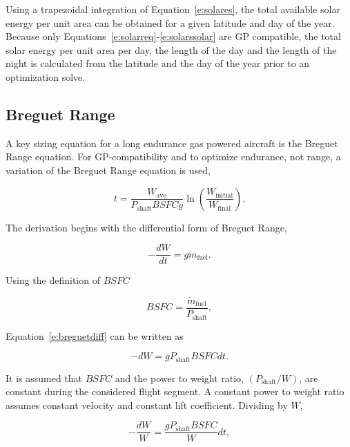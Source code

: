 \documentclass[]{aiaa-tc}%
\begin{document}
    Using a trapezoidal integration of Equation~\eqref{e:solares}, the total available solar energy per unit area can be obtained for a given latitude and day of the year. Because only Equations~\eqref{e:solarreq}-\eqref{e:solarssolar} are GP compatible, the total solar energy per unit area per day, the length of the day and the length of the night is calculated from the latitude and the day of the year prior to an optimization solve.

\subsection{Breguet Range}

A key sizing equation for a long endurance gas powered aircraft is the Breguet Range equation.  
For GP-compatibility and to optimize endurance, not range, a variation of the Breguet Range equation is used, 

\begin{equation}
    \label{e:breguetendurance}
    t = \frac{W_{\text{ave}}}{P_{\text{shaft}}BSFCg} \ln{\left( \frac{W_{\text{initial}}}{W_{\text{final}}}\right)}.
\end{equation}

The derivation begins with the differential form of Breguet Range,\cite{br2}

\begin{equation}
    \label{e:breguetdiff}
    -\frac{dW}{dt} = g\dot{m}_{\text{fuel}}.
\end{equation}

Using the definition of $BSFC$

\begin{equation}
    \label{e:brBSFC}
    BSFC = \frac{\dot{m}_{\text{fuel}}}{P_{\text{shaft}}},
\end{equation}

Equation~\eqref{e:breguetdiff} can be written as

\begin{equation}
    \label{e:brdiff2}
    -dW = g P_{\text{shaft}} BSFC dt.
\end{equation}

It is assumed that $BSFC$ and the power to weight ratio, $(P_{\text{shaft}}/W)$, are constant during the considered flight segment. 
A constant power to weight ratio assumes constant velocity and constant lift coefficient.\cite{br2}
Dividing by $W$,

\begin{equation}
    \label{e:brdiff2}
    -\frac{dW}{W} = \frac{g P_{\text{shaft}}BSFC }{W} dt,
\end{equation}
\end{document}
